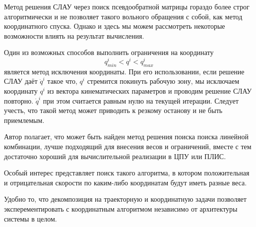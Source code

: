 Метод решения СЛАУ через поиск псевдообратной матрицы гораздо более строг алгоритмически и не позволяет такого вольного обращения с собой, как метод координатного спуска. Однако и здесь мы можем рассмотреть некоторые возможности влиять на результат вычисления.

Один из возможных способов выполнить ограничения на координату
\begin{equation}
q^i_{min} < q^i < q^i_{max} 
\end{equation} является метод исключения координаты. При его использовании, если решение СЛАУ даёт $\dot{q}^i$ такое что, $q^i$ стремится покинуть рабочую зону, мы исключаем координату $q^i$ из вектора кинематических параметров и проводим решение СЛАУ повторно. $\dot{q}^i$ при этом считается равным нулю на текущей итерации. Следует учесть, что такой метод может приводить к резкому останову и не быть приемлемым.

Автор полагает, что может быть найден метод решения поиска поиска линейной комбинации, лучше подходящий для внесения весов и ограничений, вместе с тем достаточно хороший для вычислительной реализации в ЦПУ или ПЛИС.

Особый интерес представляет поиск такого алгоритма, в котором положительная и отрицательная скорости по каким-либо координатам будут иметь разные веса. 

Удобно то, что декомпозиция на траекторную и координатную задачи позволяет эксперементировать с координатным алгоритмом независимо от архитектуры системы в целом.